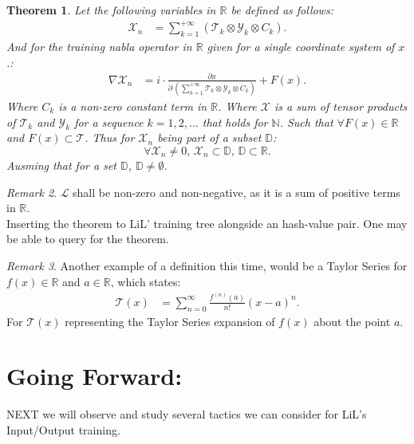 \documentclass[10pt]{article}
\theoremstyle{plain}
\newtheorem{theorem}{Theorem}[section]
\theoremstyle{definition}
\theoremstyle{remark}
\newtheorem{remark}[theorem]{Remark}
\begin{document}
\begin{theorem}
Let the following variables in $\mathbb{R}$ be defined as follows:
\begin{align*}
    \mathcal{X}_n &= \sum_{k=1}^{+\infty} (\mathcal{T}_k \otimes \mathcal{Y}_k \otimes C_k).
\end{align*}
And for the training nabla operator in $\mathbb{R}$ given for a single coordinate system of $x$.:
\begin{align*}
	\nabla \mathcal{X}_n &= i \cdot \frac{\partial x}{\partial \, (\sum_{k=1}^{+\infty} \mathcal{T}_k \otimes \mathcal{Y}_k \otimes C_k)} + F(x).
\end{align*}
Where $C_k$ is a non-zero constant term in $\mathbb{R}$. Where $\mathcal{X}$ is a sum of tensor products of $\mathcal{T}_k$ and $\mathcal{Y}_k$ for a sequence $k=1, 2, \ldots$ that holds for $\mathbb{N}$. Such that $\forall F(x) \in \mathbb{R}$ and $F(x) \subset \mathcal{T}$. Thus for $\mathcal{X}_n$ being part of a subset $\mathbb{D}$:
\begin{equation}
	\forall \mathcal{X}_n \neq 0, \, \mathcal{X}_n \subset \mathbb{D}, \, \mathbb{D} \subset \mathbb{R}.
\end{equation}
Ausming that for a set $\mathbb{D}$, $\mathbb{D} \neq \emptyset$.
\end{theorem}

\begin{remark}
    $\mathcal{L}$ shall be non-zero and non-negative, as it is a sum of positive terms in $\mathbb{R}$.\\
	Inserting the theorem to LiL' training tree alongside an hash-value pair. One may be able to query for the theorem.
\end{remark}

\begin{remark}
	Another example of a definition this time, would be a Taylor Series for $f(x) \in \mathbb{R}$ and $a \in \mathbb{R}$, which states:
	\begin{align*}
		\mathcal{T}(x) &= \sum_{n=0}^{\infty} \frac{f^{(n)}(a)}{n!} (x-a)^n.
	\end{align*}
	For $\mathcal{T}(x)$ representing the Taylor Series expansion of $f(x)$ about the point $a$.
\end{remark}

\section{Going Forward:}

\lettrine[lines=1, lhang=0.1, loversize=0.2]{N}EXT we will observe and study several tactics we can consider for LiL's Input/Output training.

\nocite{*}

\nocite{*}



\end{document}
